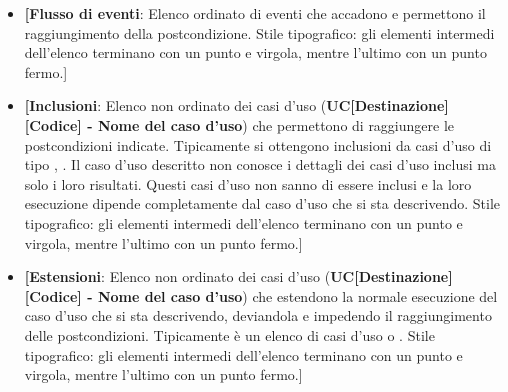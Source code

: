 \begin{itemize}
	\item \textbf{[Flusso di eventi}: Elenco ordinato di eventi che accadono e permettono il raggiungimento  della postcondizione.
	Stile tipografico: gli elementi intermedi dell'elenco terminano con un punto e virgola, mentre l'ultimo con un punto fermo.]
	\item \textbf{[Inclusioni}: Elenco non ordinato dei casi d'uso (\textbf{UC[Destinazione] [Codice] - Nome del caso d'uso}) che permettono di raggiungere le postcondizioni indicate.
	Tipicamente si ottengono inclusioni da casi d'uso di tipo , .
	Il caso d'uso descritto non conosce i dettagli dei casi d'uso inclusi ma solo i loro risultati.
	Questi casi d'uso non sanno di essere inclusi e la loro esecuzione dipende completamente dal caso d'uso che si sta descrivendo.
	Stile tipografico: gli elementi intermedi dell'elenco terminano con un punto e virgola, mentre l'ultimo con un punto fermo.]
	\item \textbf{[Estensioni}: Elenco non ordinato dei casi d'uso (\textbf{UC[Destinazione] [Codice] - Nome del caso d'uso}) che estendono la normale esecuzione del caso d'uso che si sta descrivendo, deviandola e impedendo il raggiungimento delle postcondizioni.
	Tipicamente è un elenco di casi d'uso  o .
	Stile tipografico: gli elementi intermedi dell'elenco terminano con un punto e virgola, mentre l'ultimo con un punto fermo.]
\end{itemize}

